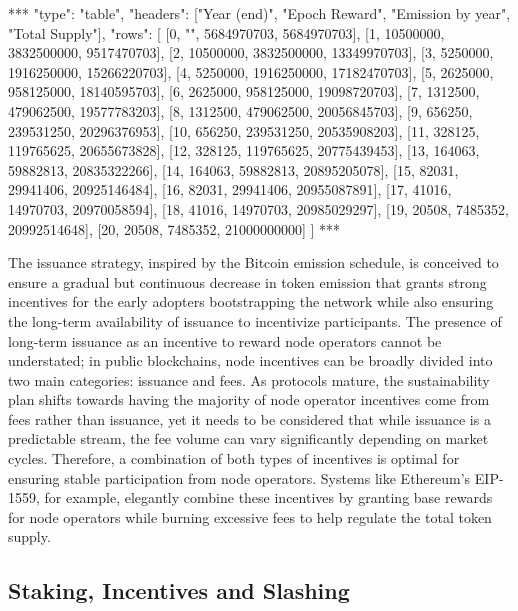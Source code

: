 \documentclass{article}
\begin{document}
\begin{center}
***
"type": "table",
"headers": ["Year (end)", "Epoch Reward", "Emission by year", "Total Supply"],
"rows": [
  [0, "", 5684970703, 5684970703],
  [1, 10500000, 3832500000, 9517470703],
  [2, 10500000, 3832500000, 13349970703],
  [3, 5250000, 1916250000, 15266220703],
  [4, 5250000, 1916250000, 17182470703],
  [5, 2625000, 958125000, 18140595703],
  [6, 2625000, 958125000, 19098720703],
  [7, 1312500, 479062500, 19577783203],
  [8, 1312500, 479062500, 20056845703],
  [9, 656250, 239531250, 20296376953],
  [10, 656250, 239531250, 20535908203],
  [11, 328125, 119765625, 20655673828],
  [12, 328125, 119765625, 20775439453],
  [13, 164063, 59882813, 20835322266],
  [14, 164063, 59882813, 20895205078],
  [15, 82031, 29941406, 20925146484],
  [16, 82031, 29941406, 20955087891],
  [17, 41016, 14970703, 20970058594],
  [18, 41016, 14970703, 20985029297],
  [19, 20508, 7485352, 20992514648],
  [20, 20508, 7485352, 21000000000]
]
***
\end{center}

The issuance strategy, inspired by the Bitcoin emission schedule, is conceived to ensure a gradual but continuous decrease in token emission that grants strong incentives for the early adopters bootstrapping the network while also ensuring the long-term availability of issuance to incentivize participants.
The presence of long-term issuance as an incentive to reward node operators cannot be understated; in public blockchains, node incentives can be broadly divided into two main categories: issuance and fees. As protocols mature, the sustainability plan shifts towards having the majority of node operator incentives come from fees rather than issuance, yet it needs to be considered that while issuance is a predictable stream, the fee volume can vary significantly depending on market cycles. Therefore, a combination of both types of incentives is optimal for ensuring stable participation from node operators. Systems like Ethereum’s EIP-1559, for example, elegantly combine these incentives by granting base rewards for node operators while burning excessive fees to help regulate the total token supply. 

\subsection{Staking, Incentives and Slashing}
\end{document}
